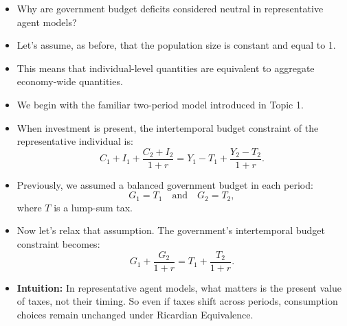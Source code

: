 \documentclass[12pt]{article}
\begin{document}
\begin{itemize}
\item Why are government budget deficits considered neutral in representative agent models?

\item Let’s assume, as before, that the population size is constant and equal to 1.

\item This means that individual-level quantities are equivalent to aggregate economy-wide quantities.

\item We begin with the familiar two-period model introduced in Topic 1.

\item When investment is present, the intertemporal budget constraint of the representative individual is:
\[
C_1 + I_1 + \frac{C_2 + I_2}{1 + r} = Y_1 - T_1 + \frac{Y_2 - T_2}{1 + r}. \tag{1}
\]

\item Previously, we assumed a balanced government budget in each period:
\[
G_1 = T_1 \quad \text{and} \quad G_2 = T_2,
\]
where \( T \) is a lump-sum tax.

\item Now let’s relax that assumption. The government’s intertemporal budget constraint becomes:
\[
G_1 + \frac{G_2}{1 + r} = T_1 + \frac{T_2}{1 + r}. \tag{2}
\]

\item \textbf{Intuition:} In representative agent models, what matters is the present value of taxes, not their timing. So even if taxes shift across periods, consumption choices remain unchanged under Ricardian Equivalence.
\end{itemize}
\end{document}
